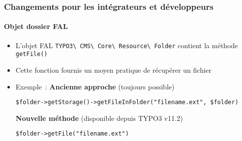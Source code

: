%

\begin{frame}[fragile]
	\frametitle{Changements pour les intégrateurs et développeurs}
	\framesubtitle{Objet dossier FAL}


	\begin{itemize}
		\item L'objet FAL
			\small\texttt{TYPO3\textbackslash
				CMS\textbackslash
				Core\textbackslash
				Resource\textbackslash
				Folder}\normalsize\newline
			contient la méthode
			\small\texttt{getFile()}\normalsize

		\item Cette fonction fournis un moyen pratique de récupérer un fichier
		\item Exemple~:\newline
			\small\textbf{Ancienne approche} (toujours possible)\normalsize
\begin{lstlisting}
$folder->getStorage()->getFileInFolder("filename.ext", $folder)
\end{lstlisting}
			\small\textbf{Nouvelle méthode} (disponible depuis TYPO3 v11.2)\normalsize
\begin{lstlisting}
$folder->getFile("filename.ext")
\end{lstlisting}

	\end{itemize}
\end{frame}

